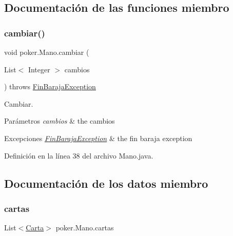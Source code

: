 \subsection{Documentación de las funciones miembro}
\mbox{\label{classpoker_1_1Mano_a1f3e7289b85d98324d46a8afce171368}} 
\subsubsection{\texorpdfstring{cambiar()}{cambiar()}}
{\footnotesize\ttfamily void poker.\+Mano.\+cambiar (\begin{DoxyParamCaption}\item[{List$<$ Integer $>$}]{cambios }\end{DoxyParamCaption}) throws \mbox{\hyperlink{classpoker_1_1FinBarajaException}{Fin\+Baraja\+Exception}}}



Cambiar. 


\begin{DoxyParams}{Parámetros}
{\em cambios} & the cambios \\
\hline
\end{DoxyParams}

\begin{DoxyExceptions}{Excepciones}
{\em \mbox{\hyperlink{classpoker_1_1FinBarajaException}{Fin\+Baraja\+Exception}}} & the fin baraja exception \\
\hline
\end{DoxyExceptions}


Definición en la línea 38 del archivo Mano.\+java.


\begin{DoxyCode}{0}

\end{DoxyCode}


\subsection{Documentación de los datos miembro}
\mbox{\label{classpoker_1_1Mano_ae6e107ad79d163a4c45afc6274d36d9e}} 
\subsubsection{\texorpdfstring{cartas}{cartas}}
{\footnotesize\ttfamily List$<$\mbox{\hyperlink{classpoker_1_1Carta}{Carta}}$>$ poker.\+Mano.\+cartas\hspace{0.3cm}{\ttfamily [private]}}



